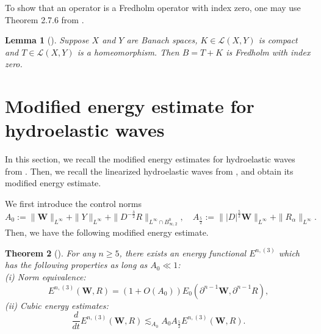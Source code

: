 \documentclass[12pt]{amsart}
\newtheorem{theorem}{Theorem}[section]
\newtheorem{lemma}[theorem]{Lemma}
\theoremstyle{remark}
\theoremstyle{definition}
\numberwithin{equation}{section}
\newcommand{\p}{\partial}
\newcommand{\al}{\alpha}
\newcommand{\f}{\frac}
\newcommand{\bw}{\mathbf{W}}
\begin{document}
To show that an operator is a Fredholm operator with index zero, one may use Theorem 2.7.6 from \cite{MR1956130}.
\begin{lemma}[\hspace{1sp}\cite{MR1956130}]\label{t:Fredholm}
Suppose $X$ and $Y$ are Banach spaces, $K \in \mathcal{L}(X, Y)$ is compact and $T \in \mathcal{L}(X, Y)$ is a homeomorphism. 
Then $B= T + K$ is Fredholm with index zero.
\end{lemma}

\section{Modified energy estimate for hydroelastic waves} \label{s:Modified}
In this section, we recall the modified energy estimates for hydroelastic waves from \cite{MR4846707}.
Then, we recall the linearized hydroelastic waves from \cite{WanY}, and obtain its modified energy estimate.

We first introduce the control norms
\begin{equation}\label{MRA}
A_0:=\|\bw\|_{L^{\infty}}+\|Y\|_{L^{\infty}}+\|D^{-\f32}R\|_{L^{\infty}\cap B^{0}_{\infty, 2}}, \quad A_{\f52}:=\||D|^{\f52}\bw\|_{L^{\infty}}+\|R_{\al}\|_{L^{\infty}}.
\end{equation}
Then, we have the following modified energy estimate.
\begin{theorem}[\hspace{1sp}\cite{MR4846707}]\label{t:QMEHP}
For any $n\geq5$, there exists an energy functional $E^{n,(3)}$ which has the following properties as long as $A_0\ll1$:\\
(i) Norm equivalence:
\[
E^{n,(3)}(\bw,R)=(1+O(A_0))E_0(\p^{n-1}\bw,\p^{n-1}R),
\]
(ii) Cubic energy estimates:
\[
\f{d}{dt}E^{n,(3)}(\bw,R)\lesssim_{A_0}A_0 A_{\f52}E^{n,(3)}(\bw,R).
\]
\end{theorem}
\end{document}
